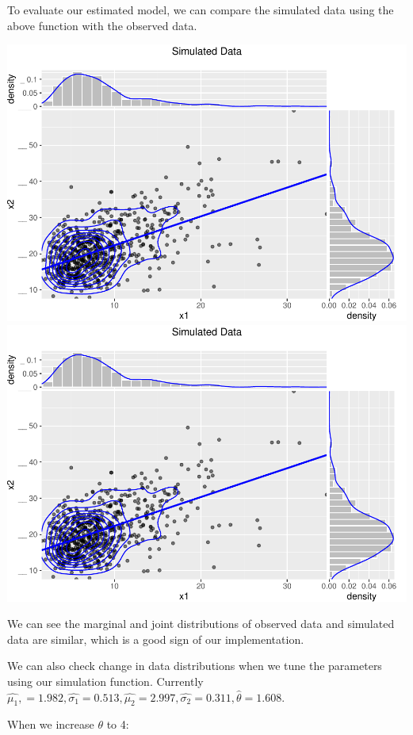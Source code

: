\documentclass[11pt,]{article}
\begin{document}
To evaluate our estimated model, we can compare the simulated data using
the above function with the observed data.

\includegraphics{figs/unnamed-chunk-6.pdf}
\includegraphics{figs/unnamed-chunk-6.pdf}

We can see the marginal and joint distributions of observed data and
simulated data are similar, which is a good sign of our implementation.

We can also check change in data distributions when we tune the
parameters using our simulation function. Currently
\(\hat{\mu_{1}},= 1.982,\hat{\sigma_{1}}=0.513,\hat{\mu_{2}}=2.997,\hat{\sigma_{2}}=0.311,\hat{\theta}=1.608\).

When we increase \(\theta\) to 4:
\end{document}
